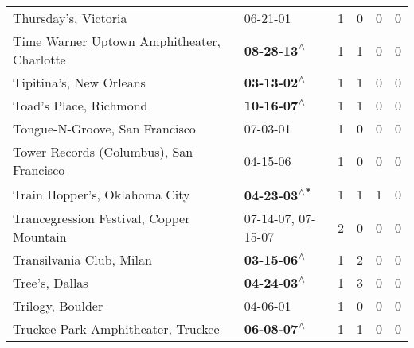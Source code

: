 \begin{supertabular}{p{0.4\textwidth}p{0.3\textwidth}p{0.05\textwidth}p{0.05\textwidth}p{0.05\textwidth}p{0.05\textwidth}}
                                                         Thursday's, Victoria &                                                                  06-21-01\textsuperscript{} &  1 &  0 &  0 &  0 \\
                                   Time Warner Uptown Amphitheater, Charlotte &                                                 \textbf{08-28-13\textsuperscript{$\wedge$}} &  1 &  1 &  0 &  0 \\
                                                      Tipitina's, New Orleans &                                                 \textbf{03-13-02\textsuperscript{$\wedge$}} &  1 &  1 &  0 &  0 \\
                                                       Toad's Place, Richmond &                                                 \textbf{10-16-07\textsuperscript{$\wedge$}} &  1 &  1 &  0 &  0 \\
                                               Tongue-N-Groove, San Francisco &                                                                  07-03-01\textsuperscript{} &  1 &  0 &  0 &  0 \\
                                      Tower Records (Columbus), San Francisco &                                                                  04-15-06\textsuperscript{} &  1 &  0 &  0 &  0 \\
                                                Train Hopper's, Oklahoma City &                                                \textbf{04-23-03\textsuperscript{$\wedge$*}} &  1 &  1 &  1 &  0 \\
                                     Trancegression Festival, Copper Mountain &                                      07-14-07\textsuperscript{}, 07-15-07\textsuperscript{} &  2 &  0 &  0 &  0 \\
                                                     Transilvania Club, Milan &                                                 \textbf{03-15-06\textsuperscript{$\wedge$}} &  1 &  2 &  0 &  0 \\
                                                               Tree's, Dallas &                                                 \textbf{04-24-03\textsuperscript{$\wedge$}} &  1 &  3 &  0 &  0 \\
                                                             Trilogy, Boulder &                                                                  04-06-01\textsuperscript{} &  1 &  0 &  0 &  0 \\
                                           Truckee Park Amphitheater, Truckee &                                                 \textbf{06-08-07\textsuperscript{$\wedge$}} &  1 &  1 &  0 &  0 \\

\end{supertabular}
